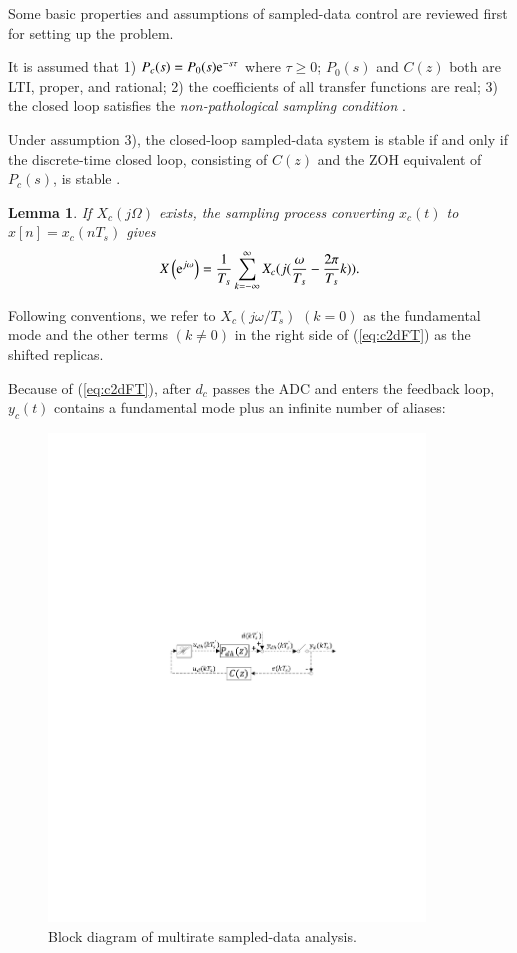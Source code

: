 \documentclass [11pt, proquest] {uwthesis}[2020/02/24]
\newtheorem{lemma}{Lemma}
\begin{document}
Some basic properties and assumptions of sampled-data control are
reviewed first for setting up the problem.

It is assumed that 1) $P_{c}(s)=P_{0}(s)\mathrm{e}^{-s\tau}$ where $\tau\geq0$;
$P_{0}(s)$ and $C(z)$ both are LTI, proper, and rational; 2) the
coefficients of all transfer functions are real; 3) the closed loop
satisfies the\emph{ non-pathological sampling condition} \cite{kalman_contributions_1963}.

Under assumption 3), the closed-loop sampled-data system is stable
if and only if the discrete-time closed loop, consisting of $C(z)$
and the ZOH equivalent of $P_{c}(s)$, is stable \cite{Francis1988,Middleton1995315}.

\begin{lemma}\cite{hayes2009statistical_DSP} \label{If--exists,}If
$X_{c}(j\Omega)$ exists, the sampling process converting $x_{c}(t)$
to $x[n]=x_{c}(nT_{s})$ gives
\begin{equation}
X\left(\mathrm{e}^{j\omega}\right)=\frac{1}{T_{s}}\sum_{k=-\infty}^{\infty}X_{c}(j(\frac{\omega}{T_{s}}-\frac{2\pi}{T_{s}}k)).\label{eq:c2dFT}
\end{equation}

\end{lemma}Following conventions, we refer to $X_{c}(j\omega/T_{s})$
$(k=0)$ as the fundamental mode and the other terms $(k\neq0)$ in
the right side of (\ref{eq:c2dFT}) as the shifted replicas.

Because of (\ref{eq:c2dFT}), after $d_{c}$ passes the ADC and enters the feedback
loop, $y_{c}(t)$ contains a fundamental mode plus an infinite number
of aliases:
\begin{figure}[!ht]
\begin{centering}
\includegraphics[width=10cm]{Spectral-analysis/FIG2.pdf}
\par\end{centering}
\caption{\label{fig:Block-diagramPCH-with}Block diagram of multirate sampled-data
analysis.}
\end{figure}
\end{document}
